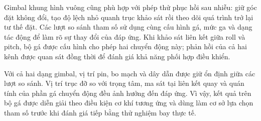 Gimbal khung hình vuông cũng phù hợp với phép thử phục hồi sau nhiễu: giữ góc đặt không đổi, tạo độ lệch nhỏ quanh trục khảo sát rồi theo dõi quá trình trở lại tư thế đặt. Các lượt so sánh tham số sử dụng cùng cấu hình gá, mức ga và dạng tác động để làm rõ sự thay đổi của đáp ứng. Khi khảo sát liên kết giữa roll và pitch, bộ gá được cấu hình cho phép hai chuyển động này; phản hồi của cả hai kênh được quan sát đồng thời để đánh giá khả năng phối hợp điều khiển.

Với cả hai dạng gimbal, vị trí pin, bo mạch và dây dẫn được giữ ổn định giữa các lượt so sánh. Vị trí trục đỡ so với trọng tâm, ma sát tại liên kết quay và quán tính của phần gá chuyển động đều ảnh hưởng đến đáp ứng. Vì vậy, kết quả trên bộ gá được diễn giải theo điều kiện cơ khí tương ứng và dùng làm cơ sở lựa chọn tham số trước khi đánh giá tiếp bằng thử nghiệm bay thực tế.
